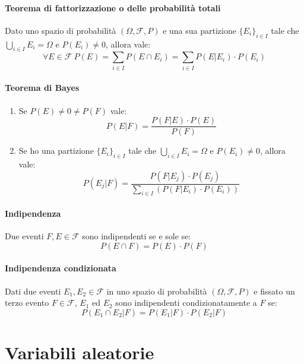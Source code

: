 \documentclass[12pt, a4paper]{report}
\theoremstyle{definition}
\begin{document}
\paragraph{Teorema di fattorizzazione o delle probabilità totali}
Dato uno spazio di probabilità $(\Omega, \mathcal{F}, P)$ e una sua partizione
$\{E_i\}_{i\in I}$ tale che $\bigcup_{i\in I}E_i=\Omega$ e $P(E_i)\neq0$, allora
vale:
\[\forall E\in\mathcal{F}\ P(E)=\sum_{i\in I}P(E\cap E_i)=\sum_{i\in I}P(E|E_i)
\cdot P(E_i)\]

\paragraph{Teorema di Bayes}
\mbox{}
\begin{enumerate}[label=(\roman*)]
    \item Se $P(E)\neq0\neq P(F)$ vale:
    \[P(E|F)=\frac{P(F|E)\cdot P(E)}{P(F)}\]
    \item Se ho una partizione $\{E_i\}_{i\in I}$ tale che $\bigcup_{i\in I}E_i=
    \Omega$ e $P(E_i)\neq0$, allora vale:
    \[P(E_j|F)=\frac{P(F|E_j)\cdot P(E_j)}{\sum_{i\in I}(P(F|E_i)\cdot P(E_i))}\]
\end{enumerate}

\paragraph{Indipendenza}
Due eventi $F,E\in\mathcal{F}$ sono indipendenti se e sole se:
\[P(E\cap F)=P(E)\cdot P(F)\]

\paragraph{Indipendenza condizionata}
Dati due eventi \(E_1,E_2\in\mathcal{F}\) in uno spazio di probabilità $(\Omega,
\mathcal{F}, P)$ e fissato un terzo evento \(F\in\mathcal{F}\), $E_1$ ed $E_2$
sono indipendenti condizionatamente a $F$ se:
\[P(E_1\cap E_2|F)=P(E_1|F)\cdot P(E_2|F)\]

\section{Variabili aleatorie}
\end{document}
